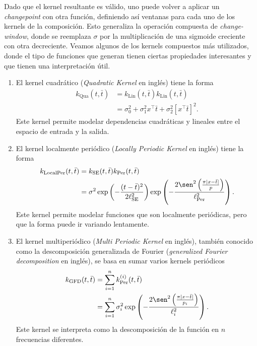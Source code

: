 Dado que el kernel resultante es válido, uno puede volver a aplicar un \emph{changepoint} con otra función, definiendo así ventanas para cada uno de los kernels de la composición. Esto generaliza la operación compuesta de \emph{change-window}, donde se reemplaza \(\sigma\) por la multiplicación de una sigmoide creciente con otra decreciente. Veamos algunos de los kernels compuestos más utilizados, donde el tipo de funciones que generan tienen ciertas propiedades interesantes y que tienen una interpretación útil.
\begin{enumerate}
	\item El kernel cuadrático (\emph{Quadratic Kernel} en inglés) tiene la forma
	\begin{align*}
		k_{\mathrm{Qua}}(t, \bar{t})	&= k_{\mathrm{Lin}}(t, \bar{t}) k_{\mathrm{Lin}}(t, \bar{t}) \\
										&= \sigma_{0}^{2} + \sigma_{1}^{2} x^\top \bar{t} + \sigma_{2}^{2}\left[x^\top \bar{t}\right]^{2}.
	\end{align*}
	Este kernel permite modelar dependencias cuadráticas y lineales entre el espacio de entrada y la salida.
	\item El kernel localmente periódico (\emph{Locally Periodic Kernel} en inglés) tiene la forma
	\begin{align*}
		k_{\mathrm{LocalPer}}(t, \bar{t})	&= k_{\mathrm{SE}}(t, \bar{t}) k_{\mathrm{Per}}(t, \bar{t}) \\
											&= \sigma^2 \exp \left(-\frac{(t - \bar{t})^{2}}{2\ell_{\mathrm{SE}}^2}\right) \exp \left(-\frac{2 \sen^{2} \left(\frac{\pi \vert x - \bar{t}\vert}{p}\right)}{\ell_{\mathrm{Per}}^2}\right).
	\end{align*}
	Este kernel permite modelar funciones que son localmente periódicas, pero que la forma puede ir variando lentamente.
	\item El kernel multiperiódico (\emph{Multi Periodic Kernel} en inglés), también conocido como la descomposición generalizada de Fourier (\emph{generalized Fourier decomposition} en inglés), se basa en sumar varios kernels periódicos
	\begin{align*}
		k_{\mathrm{GFD}}(t, \bar{t})	&= \sum_{i=1}^{n} k_{\mathrm{Per}}^{(i)}(t, \bar{t}) \\
										&= \sum_{i=1}^{n} \sigma_{i}^{2} \exp \left(-\frac{2\sen^{2}\left(\frac{\pi \vert x - \bar{t} \vert}{p_i}\right)}{\ell_{i}^{2}}\right).
	\end{align*}
	Este kernel se interpreta como la descomposición de la función en \(n\) frecuencias diferentes.

\end{enumerate}
